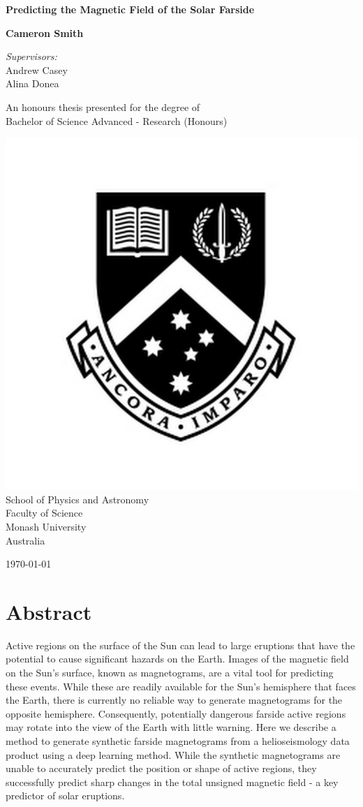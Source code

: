 \documentclass[11pt,a4paper,onecolumn]{report}
\begin{document}
\begin{titlepage}
  \begin{center}
    \vspace*{2cm}
    \Huge
    \textbf{Predicting the Magnetic Field of the Solar Farside}

    \vspace{2cm}
    \LARGE
    \textbf{Cameron Smith}

    \vspace{0.8cm}
    \Large \textit{Supervisors:}\\
    Andrew Casey\\
    Alina Donea

    \vfill
    \large
    An honours thesis presented for the degree of\\
    Bachelor of Science Advanced - Research (Honours)

    \vspace{0.3cm}
    \includegraphics[width=0.2\linewidth]{"Monash_Logo"}\\
    School of Physics and Astronomy\\
    Faculty of Science\\
    Monash University\\
    Australia

    \vspace{0.5cm}

    \today

  \end{center}
\end{titlepage}

\chapter*{Abstract}
Active regions on the surface of the Sun can lead to large eruptions that have
the potential to cause significant hazards on the Earth. Images of the magnetic
field on the Sun's surface, known as magnetograms, are a vital tool for
predicting these events. While these are readily available for the Sun's
hemisphere that faces the Earth, there is currently no reliable way to
generate magnetograms for the opposite hemisphere. Consequently, potentially
dangerous farside active regions may rotate into the view of the Earth with little
warning. Here we describe a method to generate synthetic farside magnetograms
from a helioseismology data product using a deep learning method. While the
synthetic magnetograms are unable to accurately predict the position or shape of
active regions, they successfully predict sharp changes in the total unsigned
magnetic field - a key predictor of solar eruptions.
\end{document}
